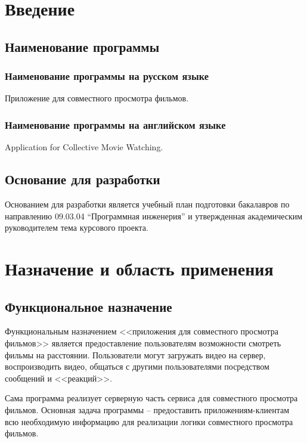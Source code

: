 \documentclass{../includes/TechDoc}
\begin{document}
    \newpage

    \tableofcontents


    \section{Введение}

    \subsection{Наименование программы}

    \subsubsection{Наименование программы на русском языке}

    Приложение для совместного просмотра фильмов.

    \subsubsection{Наименование программы на английском языке}

    Application for Collective Movie Watching.

    \subsection{Основание для разработки}

    Основанием для разработки является учебный план подготовки бакалавров по направлению 09.03.04 ``Программная инженерия'' и утвержденная академическим руководителем тема курсового проекта.


    \section{Назначение и область применения}

    \subsection{Функциональное назначение}

    Функциональным назначением <<приложения для совместного просмотра фильмов>> является предоставление пользователям возможности смотреть фильмы на расстоянии.
    Пользователи могут загружать видео на сервер, воспроизводить видео, общаться с другими пользователями посредством сообщений и <<реакций>>.

    Сама программа реализует серверную часть сервиса для совместного просмотра фильмов.
    Основная задача программы -- предоставить приложениям-клиентам всю необходимую информацию для реализации логики совместного просмотра фильмов.
\end{document}
